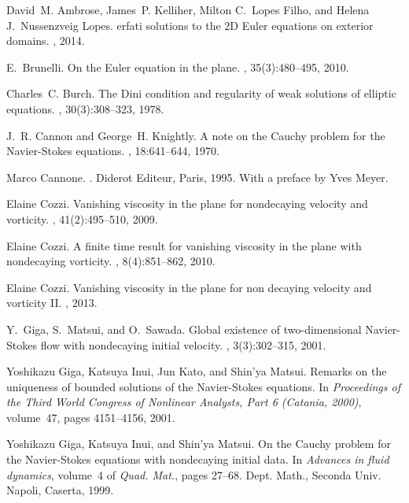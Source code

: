 \documentclass[reqno,openright,11pt,twoside]{amsart}
\theoremstyle{definition}
\numberwithin{equation}{section}
\begin{document}
 
\begin{thebibliography}{10}

David~M. Ambrose, James~P. Kelliher, Milton C.~Lopes Filho, and Helena
  J.~Nussenzveig Lopes.
erfati solutions to the 2{D} {E}uler equations on exterior
  domains.
, 2014.

E.~Brunelli.
\newblock On the {E}uler equation in the plane.
, 35(3):480--495, 2010.

Charles~C. Burch.
\newblock The {D}ini condition and regularity of weak solutions of elliptic
  equations.
, 30(3):308--323, 1978.

J.~R. Cannon and George~H. Knightly.
\newblock A note on the {C}auchy problem for the {N}avier-{S}tokes equations.
, 18:641--644, 1970.

Marco Cannone.
.
\newblock Diderot Editeur, Paris, 1995.
\newblock With a preface by Yves Meyer.

Elaine Cozzi.
\newblock Vanishing viscosity in the plane for nondecaying velocity and
  vorticity.
, 41(2):495--510, 2009.

Elaine Cozzi.
\newblock A finite time result for vanishing viscosity in the plane with
  nondecaying vorticity.
, 8(4):851--862, 2010.

Elaine Cozzi.
\newblock Vanishing viscosity in the plane for non decaying velocity and
  vorticity {II}.
, 2013.

Y.~Giga, S.~Matsui, and O.~Sawada.
\newblock Global existence of two-dimensional {N}avier-{S}tokes flow with
  nondecaying initial velocity.
, 3(3):302--315, 2001.

Yoshikazu Giga, Katsuya Inui, Jun Kato, and Shin'ya Matsui.
\newblock Remarks on the uniqueness of bounded solutions of the
  {N}avier-{S}tokes equations.
\newblock In {\em Proceedings of the {T}hird {W}orld {C}ongress of {N}onlinear
  {A}nalysts, {P}art 6 ({C}atania, 2000)}, volume~47, pages 4151--4156, 2001.

Yoshikazu Giga, Katsuya Inui, and Shin'ya Matsui.
\newblock On the {C}auchy problem for the {N}avier-{S}tokes equations with
  nondecaying initial data.
\newblock In {\em Advances in fluid dynamics}, volume~4 of {\em Quad. Mat.},
  pages 27--68. Dept. Math., Seconda Univ. Napoli, Caserta, 1999.


\end{thebibliography}
\end{document}
